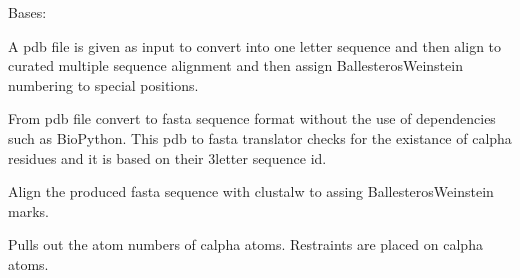 \documentclass[letterpaper,10pt,english]{sphinxmanual}
\begin{document}
\begin{fulllineitems}
\label{\detokenize{bw4posres:bw4posres.Run}}
\pysigstartsignatures
{}
\pysigstopsignatures
\sphinxAtStartPar
Bases: 

\sphinxAtStartPar
A pdb file is given as input to convert into one letter sequence
and then align to curated multiple sequence alignment and then
assign Ballesteros\sphinxhyphen{}Weinstein numbering to special positions.

\begin{fulllineitems}
\label{\detokenize{bw4posres:bw4posres.Run.pdb2fas}}
\pysigstartsignatures
{}
\pysigstopsignatures
\sphinxAtStartPar
From pdb file convert to fasta sequence format without the use of
dependencies such as BioPython. This pdb to fasta translator
checks for the existance of c\sphinxhyphen{}alpha residues and it is
based on their 3\sphinxhyphen{}letter sequence id.

\end{fulllineitems}


\begin{fulllineitems}
\label{\detokenize{bw4posres:bw4posres.Run.clustalalign}}
\pysigstartsignatures
{}
\pysigstopsignatures
\sphinxAtStartPar
Align the produced fasta sequence with clustalw to assing
Ballesteros\sphinxhyphen{}Weinstein marks.

\end{fulllineitems}


\begin{fulllineitems}
\label{\detokenize{bw4posres:bw4posres.Run.getcalphas}}
\pysigstartsignatures
{}
\pysigstopsignatures
\sphinxAtStartPar
Pulls out the atom numbers of c\sphinxhyphen{}alpha atoms. Restraints are
placed on c\sphinxhyphen{}alpha atoms.


\end{fulllineitems}
\end{fulllineitems}
\end{document}
